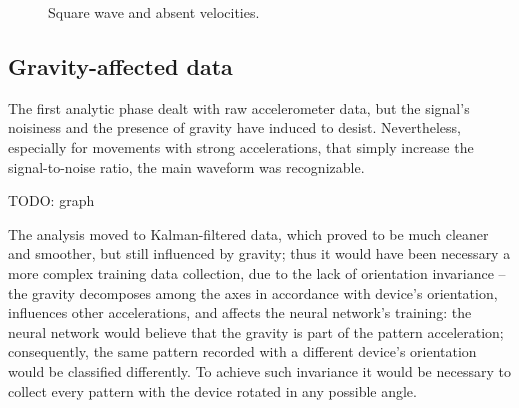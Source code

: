 \begin{center}
	\begin{figure}[ht]
		\caption{Square wave and absent velocities.}
	\end{figure}
\end{center}

\subsection{Gravity-affected data}
The first analytic phase dealt with raw accelerometer data, but the signal's noisiness and the presence of gravity have induced to desist. Nevertheless, especially for movements with strong accelerations, that simply increase the signal-to-noise ratio, the main waveform was recognizable.
\bigbreak

TODO: graph
\bigbreak

The analysis moved to Kalman-filtered data, which proved to be much cleaner and smoother, but still influenced by gravity; thus it would have been necessary a more complex training data collection, due to the lack of orientation invariance – the gravity decomposes among the axes in accordance with device's orientation, influences other accelerations, and affects the neural network's training: the neural network would believe that the gravity is part of the pattern acceleration; consequently, the same pattern recorded with a different device's orientation would be classified differently. To achieve such invariance it would be necessary to collect every pattern with the device rotated in any possible angle.
\bigbreak

